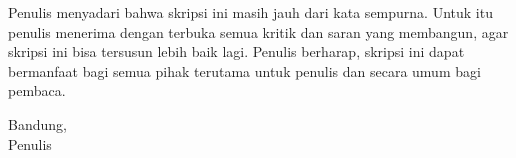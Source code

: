 Penulis menyadari bahwa skripsi ini masih jauh dari kata sempurna. Untuk itu penulis menerima dengan terbuka semua kritik dan saran yang membangun, agar skripsi ini bisa tersusun lebih baik lagi. Penulis berharap, skripsi ini dapat bermanfaat bagi semua pihak terutama untuk penulis dan secara umum bagi pembaca.
 
\vspace{1cm}

\begin{flushright}
    \begin{minipage}{5cm} %
        \centering %
        Bandung, \tahun %
        \vspace{2cm} %
        \\
        Penulis
    \end{minipage}
\end{flushright}
